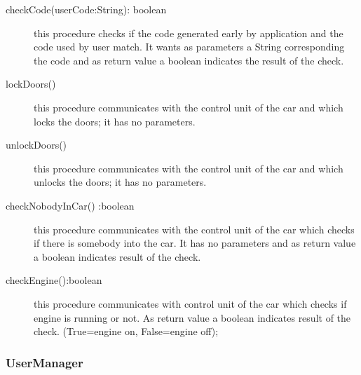 \documentclass{scrreprt}
\begin{document}
\begin{description}
\item[checkCode(userCode:String): boolean] this procedure checks if the code generated early by application and the code used by user match. It wants as parameters  a String corresponding the code and as return value a boolean indicates the result of the check.

\item[lockDoors()] this procedure communicates with the control unit of the car and which locks the doors; it has no parameters.
\item[unlockDoors()] this procedure communicates with the control unit of the car and which unlocks the doors; it has no parameters.
\item[checkNobodyInCar() :boolean] this procedure communicates with the control unit of the car which checks if there is somebody into the car. It has no parameters and as return value a boolean indicates result of the check.
\item[checkEngine():boolean] this procedure communicates with control unit of the car which checks if engine is running or not. As return value a boolean indicates result of the check. (True=engine on, False=engine off);
\end{description}

\subsubsection{UserManager}
\end{document}

